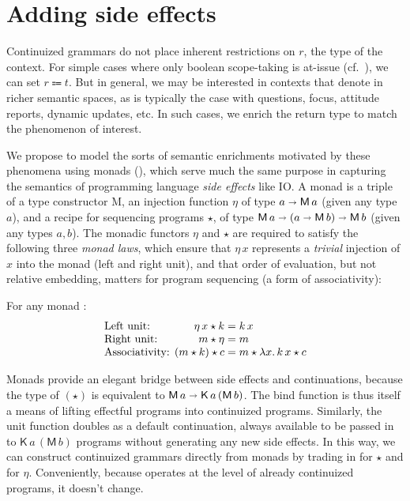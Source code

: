 
\section{Adding side effects}
  Continuized grammars do not place inherent restrictions on $r$, the type of the context. For simple cases where only boolean scope-taking is at-issue (cf.~\citealt{BarwiseCooper:1981}), we can set $r \Coloneqq t$. But in general, we may be interested in contexts that denote in richer semantic spaces, as is typically the case with questions, focus, attitude reports, dynamic updates, etc. In such cases, we enrich the return type to match the phenomenon of interest. %

  We propose to model the sorts of semantic enrichments motivated by these phenomena using monads (\citealt{Wadler:1994, Liangetal}), which serve much the same purpose in capturing the semantics of programming language \emph{side effects} like IO\@. A monad is a triple  of a type constructor \textsf{M}, an injection function $\eta$ of type $a \shortrightarrow \textsf{M}\,a$ (given any type $a$), and a recipe for sequencing programs $\star$, of type $\textsf{M}\,a \shortrightarrow (a \shortrightarrow \textsf{M}\,b) \shortrightarrow \textsf{M}\,b$ (given any types $a,b$). The monadic functors $\eta$ and $\star$ are required to satisfy the following three \emph{monad laws}, which ensure that $\eta\,x$ represents a \emph{trivial} injection of $x$ into the monad (left and right unit), and that order of evaluation, but not relative embedding, matters for program sequencing (a form of associativity): %
	\begin{defi}%
		For any monad :
		\[\begin{array}{l@{}r@{}l}
			\text{Left unit: }&\eta\,x \star k &{}= k\,x
			\\
			\text{Right unit: }&m \star \eta &{}= m
			\\
			\text{Associativity: }&(m \star k) \star c &{}= m \star \lambda x.\,k\,x \star c%
		\end{array}\]
	\end{defi}
	
  Monads provide an elegant bridge between side effects and continuations, because the type of $(\star)$ is equivalent to $\textsf{M}\,a \shortrightarrow \textsf{K}\,a\,(\textsf{M}\,b)$. The bind function is thus itself a means of lifting effectful programs into continuized programs. Similarly, the unit function doubles as a default continuation, always available to be passed in to $\textsf{K}\,a\,(\textsf{M}\,b)$ programs without generating any new side effects. In this way, we can construct continuized grammars directly from monads by trading in  for $\star$ and  for $\eta$. Conveniently, because  operates at the level of already continuized programs, it doesn't change.%
	
